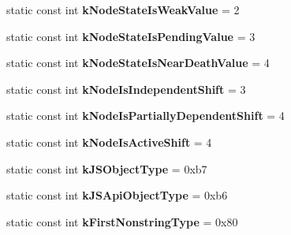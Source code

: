 \begin{DoxyCompactItemize}
\item 
static const int {\bfseries k\+Node\+State\+Is\+Weak\+Value} = 2\hypertarget{classv8_1_1internal_1_1_internals_a8a5d4cc92a6952c2a50922c77a606e68}{}\label{classv8_1_1internal_1_1_internals_a8a5d4cc92a6952c2a50922c77a606e68}

\item 
static const int {\bfseries k\+Node\+State\+Is\+Pending\+Value} = 3\hypertarget{classv8_1_1internal_1_1_internals_a843b53b17257ecd957eade0d9f21c5ab}{}\label{classv8_1_1internal_1_1_internals_a843b53b17257ecd957eade0d9f21c5ab}

\item 
static const int {\bfseries k\+Node\+State\+Is\+Near\+Death\+Value} = 4\hypertarget{classv8_1_1internal_1_1_internals_a18f3e757639b07bdabb8cda7dd4a8bdb}{}\label{classv8_1_1internal_1_1_internals_a18f3e757639b07bdabb8cda7dd4a8bdb}

\item 
static const int {\bfseries k\+Node\+Is\+Independent\+Shift} = 3\hypertarget{classv8_1_1internal_1_1_internals_a228b2b58c77c17bc512b92d9e3aea48b}{}\label{classv8_1_1internal_1_1_internals_a228b2b58c77c17bc512b92d9e3aea48b}

\item 
static const int {\bfseries k\+Node\+Is\+Partially\+Dependent\+Shift} = 4\hypertarget{classv8_1_1internal_1_1_internals_aeda4d6fc1bd10ca57398597f3bb496f3}{}\label{classv8_1_1internal_1_1_internals_aeda4d6fc1bd10ca57398597f3bb496f3}

\item 
static const int {\bfseries k\+Node\+Is\+Active\+Shift} = 4\hypertarget{classv8_1_1internal_1_1_internals_a34e042b2fa0c64f133d1605819678b36}{}\label{classv8_1_1internal_1_1_internals_a34e042b2fa0c64f133d1605819678b36}

\item 
static const int {\bfseries k\+J\+S\+Object\+Type} = 0xb7\hypertarget{classv8_1_1internal_1_1_internals_a56b7062df5d9a7df491137d4c3341bcc}{}\label{classv8_1_1internal_1_1_internals_a56b7062df5d9a7df491137d4c3341bcc}

\item 
static const int {\bfseries k\+J\+S\+Api\+Object\+Type} = 0xb6\hypertarget{classv8_1_1internal_1_1_internals_aef1693d7df34df433622fdb3e26767c8}{}\label{classv8_1_1internal_1_1_internals_aef1693d7df34df433622fdb3e26767c8}

\item 
static const int {\bfseries k\+First\+Nonstring\+Type} = 0x80\hypertarget{classv8_1_1internal_1_1_internals_a6f4a54927b01a11f444fb2f00b47ca1d}{}\label{classv8_1_1internal_1_1_internals_a6f4a54927b01a11f444fb2f00b47ca1d}


\end{DoxyCompactItemize}
